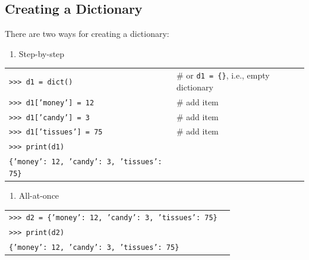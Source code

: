 \documentclass[t,handout,9pt]{beamer}
\begin{document}
\subsection{Creating a Dictionary}
\begin{frame}
\vfill
There are two ways for creating a dictionary:
\vfill
\begin{enumerate}
	\item Step-by-step
\end{enumerate}
\begin{table}[]
\begin{flushleft}
\begin{tabular}{ll}
\texttt{>{}>{}> d1 = dict()} & \# or \texttt{d1 = \{\}}, i.e., empty dictionary \\
\texttt{>{}>{}> d1['money'] = 12} &  \# add item\\
\texttt{>{}>{}> d1['candy'] = 3} &  \# add item\\
\texttt{>{}>{}> d1['tissues'] = 75} &  \# add item\\
\texttt{>{}>{}> print(d1)} &  \\
\texttt{\{'money': 12, 'candy': 3, 'tissues': 75\}} &  \\
\end{tabular}
\end{flushleft}
\end{table}
\vfill
\begin{enumerate}[2]
	\item All-at-once
\end{enumerate}
\begin{table}[]
\begin{flushleft}
\begin{tabular}{ll}
\texttt{>{}>{}> d2 = \{'money': 12, 'candy': 3, 'tissues': 75\}} &  \\
\texttt{>{}>{}> print(d2)} &  \\
\texttt{\{'money': 12, 'candy': 3, 'tissues': 75\}} &  \\
\end{tabular}
\end{flushleft}
\end{table}
\vfill
\end{frame}
%
\end{document}
